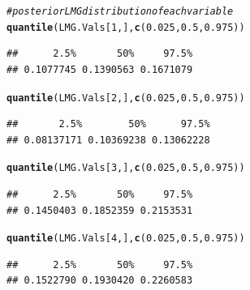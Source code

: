 \documentclass[11pt,a4paper,twoside]{book}
\makeatletter
\newcommand{\hlnum}[1]{\textcolor[rgb]{0.686,0.059,0.569}{#1}}%
\newcommand{\hlcom}[1]{\textcolor[rgb]{0.678,0.584,0.686}{\textit{#1}}}%
\newcommand{\hlstd}[1]{\textcolor[rgb]{0.345,0.345,0.345}{#1}}%
\newcommand{\hlkwd}[1]{\textcolor[rgb]{0.737,0.353,0.396}{\textbf{#1}}}%
\newenvironment{kframe}{%
 \def\at@end@of@kframe{}%
 \ifinner\ifhmode%
  \def\at@end@of@kframe{\end{minipage}}%
  \begin{minipage}{\columnwidth}%
 \fi\fi%
 \def\FrameCommand##1{\hskip\@totalleftmargin \hskip-\fboxsep
 \colorbox{shadecolor}{##1}\hskip-\fboxsep
     \hskip-\linewidth \hskip-\@totalleftmargin \hskip\columnwidth}%
 \MakeFramed {\advance\hsize-\width
   \@totalleftmargin\z@ \linewidth\hsize
   \@setminipage}}%
 {\par\unskip\endMakeFramed%
 \at@end@of@kframe}
\newenvironment{knitrout}{}{} %
\makeatother
\begin{document}
\begin{knitrout}
\begin{kframe}
\begin{alltt}
\hlcom{# posterior LMG distribution of each variable}
\hlkwd{quantile}\hlstd{(LMG.Vals[}\hlnum{1}\hlstd{,],} \hlkwd{c}\hlstd{(}\hlnum{0.025}\hlstd{,} \hlnum{0.5}\hlstd{,} \hlnum{0.975}\hlstd{))}
\end{alltt}
\begin{verbatim}
##      2.5%       50%     97.5% 
## 0.1077745 0.1390563 0.1671079
\end{verbatim}
\begin{alltt}
\hlkwd{quantile}\hlstd{(LMG.Vals[}\hlnum{2}\hlstd{,],} \hlkwd{c}\hlstd{(}\hlnum{0.025}\hlstd{,} \hlnum{0.5}\hlstd{,} \hlnum{0.975}\hlstd{))}
\end{alltt}
\begin{verbatim}
##       2.5%        50%      97.5% 
## 0.08137171 0.10369238 0.13062228
\end{verbatim}
\begin{alltt}
\hlkwd{quantile}\hlstd{(LMG.Vals[}\hlnum{3}\hlstd{,],} \hlkwd{c}\hlstd{(}\hlnum{0.025}\hlstd{,} \hlnum{0.5}\hlstd{,} \hlnum{0.975}\hlstd{))}
\end{alltt}
\begin{verbatim}
##      2.5%       50%     97.5% 
## 0.1450403 0.1852359 0.2153531
\end{verbatim}
\begin{alltt}
\hlkwd{quantile}\hlstd{(LMG.Vals[}\hlnum{4}\hlstd{,],} \hlkwd{c}\hlstd{(}\hlnum{0.025}\hlstd{,} \hlnum{0.5}\hlstd{,} \hlnum{0.975}\hlstd{))}
\end{alltt}
\begin{verbatim}
##      2.5%       50%     97.5% 
## 0.1522790 0.1930420 0.2260583
\end{verbatim}
\end{kframe}
\end{knitrout}







 

\end{document}
